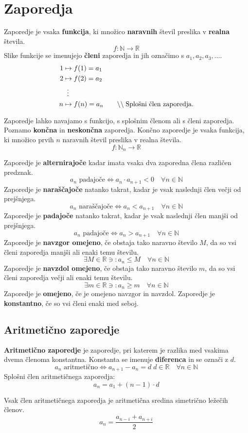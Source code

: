 \documentclass[a4paper,oneside,12pt,fleqn]{article}
\def\R{\ensuremath{\mathbb R}}
\def\N{\ensuremath{\mathbb N}}
\newcommand\krat\cdot
\newcommand{\comment}[1]{\ensuremath{\qquad\backslash\backslash\;}\textnormal{#1}}
\renewcommand\iff\Leftrightarrow
\numberwithin{equation}{section}
\begin{document}
\section{Zaporedja}
\label{sec:zap}
Zaporedje je vsaka \textbf{funkcija}, ki množico \textbf{naravnih} števil preslika v
\textbf{realna} števila. 
\[ f\!: \N \rightarrow \R \]
Slike funkcije se imenujejo \textbf{členi} zaporedja in jih označimo s $a_1,a_2,a_3, \ldots$. 
\begin{align*}
  1 &\mapsto f(1) = a_1 \\
  2 &\mapsto f(2) = a_2 \\
    & \;\; \vdots \\
  n &\mapsto f(n) = a_n \comment{Splošni člen zaporedja.}
\end{align*}

Zaporedje lahko navajamo s funkcijo, s splošnim členom ali s členi zaporedja.
Poznamo \textbf{končna} in \textbf{neskončna} zaporedja. Končno zaporedje je vsaka
funkcija, ki množico prvih $n$ naravnih števil preslika v realna števila.
\[ f\!: \N_n \rightarrow \R \]

Zaporedje je \textbf{alternirajoče} kadar imata vsaka dva zaporedna člena različen predznak.
\[ a_n \text{ padajoče} \iff a_n \krat a_{n+1} < 0 \quad \forall n \in \N \]
Zaporedje je \textbf{naraščajoče} natanko takrat, kadar je vsak naslednji člen večji od
prejšnjega.
\[ a_n \text{ naraščajoče} \iff a_n < a_{n+1} \quad \forall n \in \N \]
Zaporedje je \textbf{padajoče} natanko takrat, kadar je vsak naslednji člen manjši od prejšnjega.
\[ a_n \text{ padajoče} \iff a_n > a_{n+1} \quad \forall n \in \N \]
Zaporedje je \textbf{navzgor omejeno}, če obstaja tako naravno število $M$, da so vsi
členi zaporedja manjši ali enaki temu številu.
\[ \exists M \in \R \ni: a_n \le M \quad \forall n \in \N \]
Zaporedje je \textbf{navzdol omejeno}, če obstaja tako naravno število $m$, da so vsi
členi zaporedja večji ali enaki temu številu.
\[ \exists m \in \R \ni: a_n \ge m \quad \forall n \in \N \]
Zaporedje je \textbf{omejeno}, če je omejeno navzgor in navzdol.
Zaporedje je \textbf{konstantno}, če so vsi členi enaki med seboj.

\subsection{Aritmetično zaporedje}
\textbf{Aritmetično zaporedje} je zaporedje, pri katerem je razlika med vsakima dvema členoma
konstantna. Konstanta se imenuje \textbf{diferenca} in se označi z $d$.
\[ a_n \text{ aritmetično} \iff a_{n+1} - a_n = d \; d \in \R \quad \forall n \in \N \]
Splošni člen aritmetičnega zaporedja:
\[ a_n = a_1 + (n-1)\krat d \]

Vsak člen aritmetičnega zaporedja je aritmetična sredina simetrično ležečih členov.
\[ a_n = \frac{a_{n-i} + a_{n+i}}{2} \]




\pagebreak
\listoffigures
\end{document}
